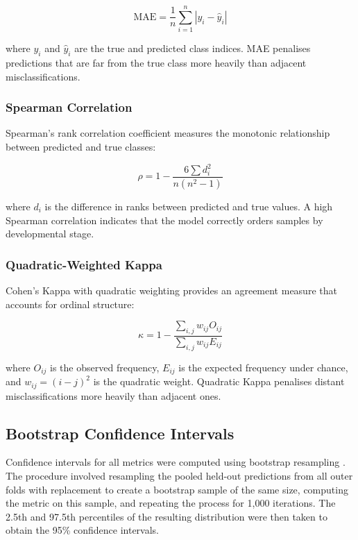 \begin{equation}
    \text{MAE} = \frac{1}{n} \sum_{i=1}^{n} |y_i - \hat{y}_i|
    \label{eq:mae}
\end{equation}

where $y_i$ and $\hat{y}_i$ are the true and predicted class indices. MAE penalises predictions that are far from the true class more heavily than adjacent misclassifications.

\subsubsection{Spearman Correlation}

Spearman's rank correlation coefficient measures the monotonic relationship between predicted and true classes:

\begin{equation}
    \rho = 1 - \frac{6 \sum d_i^2}{n(n^2 - 1)}
    \label{eq:spearman}
\end{equation}

where $d_i$ is the difference in ranks between predicted and true values. A high Spearman correlation indicates that the model correctly orders samples by developmental stage.

\subsubsection{Quadratic-Weighted Kappa}

Cohen's Kappa with quadratic weighting \parencite{cohen_weighted_1968} provides an agreement measure that accounts for ordinal structure:

\begin{equation}
    \kappa = 1 - \frac{\sum_{i,j} w_{ij} O_{ij}}{\sum_{i,j} w_{ij} E_{ij}}
    \label{eq:kappa}
\end{equation}

where $O_{ij}$ is the observed frequency, $E_{ij}$ is the expected frequency under chance, and $w_{ij} = (i-j)^2$ is the quadratic weight. Quadratic Kappa penalises distant misclassifications more heavily than adjacent ones.

\subsection{Bootstrap Confidence Intervals}

Confidence intervals for all metrics were computed using bootstrap resampling \parencite{efron_bootstrap_1979}. The procedure involved resampling the pooled held-out predictions from all outer folds with replacement to create a bootstrap sample of the same size, computing the metric on this sample, and repeating the process for 1,000 iterations. The 2.5th and 97.5th percentiles of the resulting distribution were then taken to obtain the 95\% confidence intervals.

